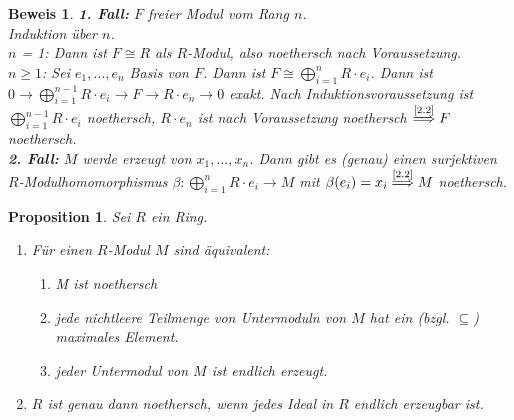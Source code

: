 \documentclass[a4paper,12pt]{scrbook}
\theoremstyle{break}
\newtheorem{Prop}[Def]{Proposition}
\theoremstyle{nonumberbreak}
\newtheorem{Bew}{Beweis}
\theoremstyle{nonumberplain}
\begin{document}
\begin{Bew}
  \textbf{1. Fall:} $F$ freier Modul vom Rang $n$.\\
  Induktion über $n$.\\
  $n$ = 1: Dann ist $F \cong R$ als $R$-Modul, also noethersch nach
  Voraussetzung.\\
  $n \ge 1$: Sei $e_1, \dots , e_n$ Basis von $F$. Dann ist $F \cong
  \bigoplus_{i = 1}^n R \cdot e_i$. Dann ist $0 \to \bigoplus_{i = 1}^{n-1} R \cdot
  e_i \to F \to R \cdot e_n \to 0$ exakt. Nach Induktionsvoraussetzung ist
  $\bigoplus_{i = 1}^{n-1} R \cdot e_i$ noethersch, $R \cdot e_n$ ist nach
  Voraussetzung noethersch $\overset{\text{\ref{2.2}}}{\Longrightarrow}
  F$ noethersch.\\
  \textbf{2. Fall:} $M$ werde erzeugt von $x_1, \dots , x_n$. Dann gibt es
  (genau) einen surjektiven $R$-Modul\-homo\-mor\-phismus $\beta: \bigoplus_{i = 1}^n
  R \cdot e_i \to M$ mit $\beta(e_i) = x_i \overset{\text{\ref{2.2}}}{\Longrightarrow} M$ noethersch.
\end{Bew}

\begin{Prop}
  Sei $R$ ein Ring.
  \begin{enumerate}
    \item\label{2.4a}
      Für einen $R$-Modul $M$ sind äquivalent:
      \begin{enumerate}
        \item[(i)] M ist noethersch
        \item[(ii)] jede nichtleere Teilmenge von Untermoduln von $M$ hat ein
                    (bzgl. $\subseteq$) maximales Element.
        \item[(iii)] jeder Untermodul von $M$ ist endlich erzeugt.
      \end{enumerate}
    \item $R$ ist genau dann noethersch, wenn jedes Ideal in $R$ endlich
          erzeugbar ist.
  \end{enumerate}
\end{Prop}
\end{document}
